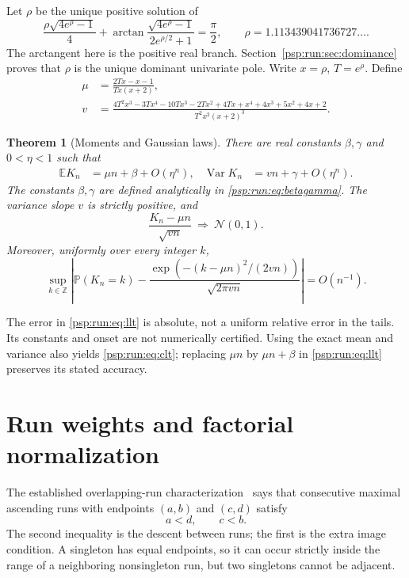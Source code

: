 \documentclass[11pt,letterpaper]{article}
\numberwithin{equation}{section}
\newtheorem{theorem}{Theorem}[section]
\theoremstyle{remark}\newtheorem{remark}[theorem]{Remark}
\newcommand{\Var}{\operatorname{Var}}
\newcommand{\EE}{\mathbb E}
\newcommand{\PP}{\mathbb P}
\begin{document}
Let $\rho$ be the unique positive solution of
\begin{equation}\label{psp:run:eq:rho}
 \frac{\rho\sqrt{4e^\rho-1}}4+
 \arctan\frac{\sqrt{4e^\rho-1}}{2e^{\rho/2}+1}=\frac\pi2,
 \qquad \rho=1.113439041736727\ldots.
\end{equation}
The arctangent here is the positive real branch. Section~\ref{psp:run:sec:dominance}
proves that $\rho$ is the unique dominant univariate pole. Write
$x=\rho$, $T=e^\rho$. Define
\begin{align}
 \mu&=\frac{2Tx-x-1}{Tx(x+2)},\label{psp:run:eq:mu}\\
 v&=\frac{4T^2x^3-3Tx^4-10Tx^3-2Tx^2+4Tx
            +x^4+4x^3+5x^2+4x+2}{T^2x^2(x+2)^3}.
 \label{psp:run:eq:v}
\end{align}
\begin{theorem}[Moments and Gaussian laws]\label{psp:run:thm:gaussian}
There are real constants $\beta,\gamma$ and $0<\eta<1$ such that
\begin{align}
 \EE K_n&=\mu n+\beta+O(\eta^n),&
 \Var K_n&=vn+\gamma+O(\eta^n).\label{psp:run:eq:moments}
\end{align}
The constants $\beta,\gamma$ are defined analytically in
\eqref{psp:run:eq:betagamma}. The variance slope $v$ is strictly positive, and
\begin{equation}\label{psp:run:eq:clt}
 \frac{K_n-\mu n}{\sqrt{vn}}\ \Longrightarrow\ \mathcal N(0,1).
\end{equation}
Moreover, uniformly over every integer $k$,
\begin{equation}\label{psp:run:eq:llt}
 \sup_{k\in\mathbb Z}\left|
 \PP(K_n=k)-\frac{\exp(-(k-\mu n)^2/(2vn))}{\sqrt{2\pi vn}}
 \right|=O(n^{-1}).
\end{equation}
\end{theorem}
The error in \eqref{psp:run:eq:llt} is absolute, not a uniform relative error in
the tails. Its constants and onset are not numerically certified.
Using the exact mean and variance also yields \eqref{psp:run:eq:clt}; replacing
$\mu n$ by $\mu n+\beta$ in \eqref{psp:run:eq:llt} preserves its stated accuracy.

\section{Run weights and factorial normalization}\label{psp:run:sec:model}
The established overlapping-run characterization~\cite{abbhl,abh} says
that consecutive maximal ascending runs with endpoints $(a,b)$ and
$(c,d)$ satisfy
\begin{equation}\label{psp:run:eq:overlap}
 a<d,\qquad c<b.
\end{equation}
The second inequality is the descent between runs; the first is the
extra image condition. A singleton has equal endpoints, so it can occur
strictly inside the range of a neighboring nonsingleton run, but two
singletons cannot be adjacent.
\end{document}

